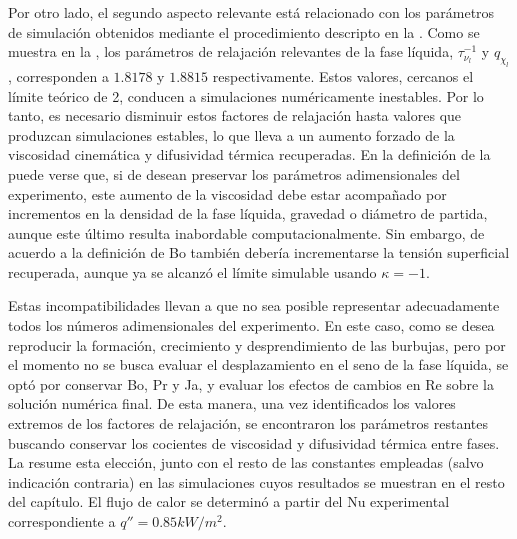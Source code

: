 Por otro lado, el segundo aspecto relevante est\'a relacionado con los par\'ametros de simulaci\'on obtenidos mediante el procedimiento descripto en la . Como se muestra en la , los par\'ametros de relajaci\'on relevantes de la fase l\'iquida, $\tau_{\nu_l}^{-1}$ y $q_{\chi_l}$, corresponden a $1.8178$ y $1.8815$ respectivamente. Estos valores, cercanos el l\'imite te\'orico de 2, conducen a simulaciones num\'ericamente inestables. Por lo tanto, es necesario disminuir estos factores de relajaci\'on hasta valores que produzcan simulaciones estables, lo que lleva a un aumento forzado de la viscosidad cinem\'atica y difusividad t\'ermica recuperadas. En la definici\'on de la  puede verse que, si de desean preservar los par\'ametros adimensionales del experimento, este aumento de la viscosidad debe estar acompa\~nado por incrementos en la densidad de la fase l\'iquida, gravedad o di\'ametro de partida, aunque este \'ultimo resulta inabordable computacionalmente. Sin embargo, de acuerdo a la definici\'on de Bo tambi\'en deber\'ia incrementarse la tensi\'on superficial recuperada, aunque ya se alcanz\'o el l\'imite simulable usando $\kappa = -1$.

Estas incompatibilidades llevan a que no sea posible representar adecuadamente todos los n\'umeros adimensionales del experimento. En este caso, como se desea reproducir la formaci\'on, crecimiento y desprendimiento de las burbujas, pero por el momento no se busca evaluar el desplazamiento en el seno de la fase l\'iquida, se opt\'o por conservar Bo, Pr y Ja, y evaluar los efectos de cambios en Re sobre la soluci\'on num\'erica final. De esta manera, una vez identificados los valores extremos de los factores de relajaci\'on, se encontraron los par\'ametros restantes buscando conservar los cocientes de viscosidad y difusividad t\'ermica entre fases. La  resume esta elecci\'on, junto con el resto de las constantes empleadas (salvo indicaci\'on contraria) en las simulaciones cuyos resultados se muestran en el resto del cap\'itulo. El flujo de calor se determin\'o a partir del Nu experimental correspondiente a $q''=0.85kW/m^2$.

